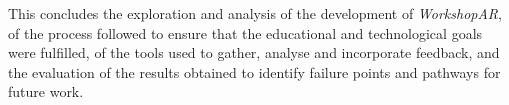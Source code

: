 This concludes the exploration and analysis of the development of \emph{WorkshopAR}, of the process followed to ensure that the educational and technological goals were fulfilled, of the
tools used to gather, analyse and incorporate feedback, and the evaluation of the results obtained to identify failure points and pathways for future work.